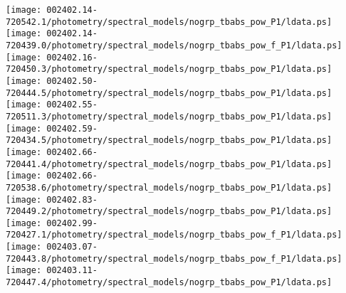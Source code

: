 \documentclass{aastex}
\begin{document}
\begin{figure*}[!ht]
\centering
\texttt{[image: 002402.14-720542.1/photometry/spectral\_models/nogrp\_tbabs\_pow\_P1/ldata.ps]} \hfill 
\texttt{[image: 002402.14-720439.0/photometry/spectral\_models/nogrp\_tbabs\_pow\_f\_P1/ldata.ps]} \hfill 
\texttt{[image: 002402.16-720450.3/photometry/spectral\_models/nogrp\_tbabs\_pow\_P1/ldata.ps]} \\ 
\vspace*{0.5in}
\texttt{[image: 002402.50-720444.5/photometry/spectral\_models/nogrp\_tbabs\_pow\_P1/ldata.ps]} \hfill 
\texttt{[image: 002402.55-720511.3/photometry/spectral\_models/nogrp\_tbabs\_pow\_P1/ldata.ps]} \hfill 
\texttt{[image: 002402.59-720434.5/photometry/spectral\_models/nogrp\_tbabs\_pow\_P1/ldata.ps]} \\ 
\vspace*{0.5in}
\texttt{[image: 002402.66-720441.4/photometry/spectral\_models/nogrp\_tbabs\_pow\_P1/ldata.ps]} \hfill 
\texttt{[image: 002402.66-720538.6/photometry/spectral\_models/nogrp\_tbabs\_pow\_P1/ldata.ps]} \hfill 
\texttt{[image: 002402.83-720449.2/photometry/spectral\_models/nogrp\_tbabs\_pow\_P1/ldata.ps]} \\ 
\vspace*{0.5in}
\texttt{[image: 002402.99-720427.1/photometry/spectral\_models/nogrp\_tbabs\_pow\_f\_P1/ldata.ps]} \hfill 
\texttt{[image: 002403.07-720443.8/photometry/spectral\_models/nogrp\_tbabs\_pow\_f\_P1/ldata.ps]} \hfill 
\texttt{[image: 002403.11-720447.4/photometry/spectral\_models/nogrp\_tbabs\_pow\_P1/ldata.ps]} \\ 
\vspace*{0.5in}
\end{figure*}
\clearpage
\end{document}
